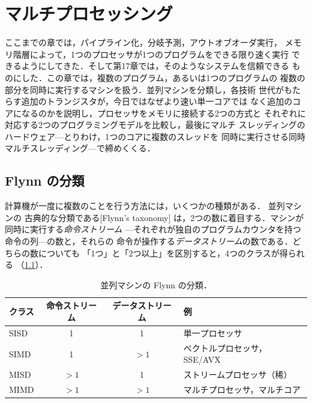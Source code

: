 \documentclass[../main.tex]{subfiles}
\begin{document}
\chapter{マルチプロセッシング}

ここまでの章では，パイプライン化，分岐予測，アウトオブオーダ実行，
メモリ階層によって，1つのプロセッサが1つのプログラムをできる限り速く実行
できるようにしてきた．そして第17章では，そのようなシステムを信頼できる
ものにした．この章では，複数のプログラム，あるいは1つのプログラムの
複数の部分を同時に実行するマシンを扱う．並列マシンを分類し，各技術
世代がもたらす追加のトランジスタが，今日ではなぜより速い単一コアでは
なく追加のコアになるのかを説明し，プロセッサをメモリに接続する2つの方式と
それぞれに対応する2つのプログラミングモデルを比較し，最後にマルチ
スレッディングのハードウェア---とりわけ，1つのコアに複数のスレッドを
同時に実行させる同時マルチスレッディング---で締めくくる．

\section{Flynn の分類}
\label{sec:l18-flynn}

計算機が一度に複数のことを行う方法には，いくつかの種類がある．
並列マシンの
古典的な分類である[Flynn's taxonomy]%
は，2つの数に着目する．マシンが同時に実行する\emph{命令ストリーム}%
---それぞれが独自のプログラムカウンタを持つ命令の列---の数と，それらの
命令が操作する\emph{データストリーム}の数である．どちらの数についても
「1つ」と「2つ以上」を区別すると，4つのクラスが得られる
（\cref{tab:l18-flynn}）．

\begin{table}[htbp]
  \centering\small
  \caption{並列マシンの Flynn の分類．}
  \label{tab:l18-flynn}
  \begin{tabular}{@{}lccl@{}}
    \toprule
    クラス & 命令ストリーム & データストリーム & 例 \\
    \midrule
    SISD & 1        & 1        & 単一プロセッサ \\
    SIMD & 1        & $>1$     & ベクトルプロセッサ，SSE/AVX \\
    MISD & $>1$     & 1        & ストリームプロセッサ（稀） \\
    MIMD & $>1$     & $>1$     & マルチプロセッサ，マルチコア \\
    \bottomrule
  \end{tabular}
\end{table}
\end{document}
